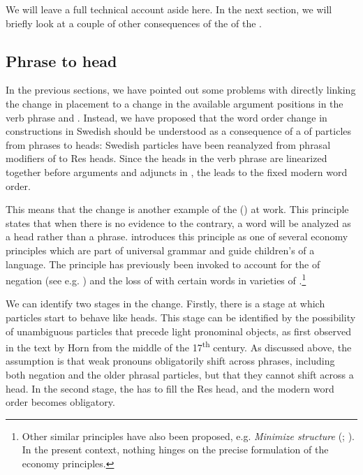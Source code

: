 \documentclass[output=paper]{langscibook}
\begin{document}
We will leave a full technical account aside here. In the next section, we will briefly look at a couple of other consequences of the  of the . 


\subsection{Phrase to head}\label{sec:lalu:6.3}

In the previous sections, we have pointed out some problems with directly linking the change in  placement to a change in the available argument positions in the verb phrase and . Instead, we have proposed that the word order change in  constructions in Swedish should be understood as a consequence of a  of particles from phrases to heads: Swedish particles have been reanalyzed from phrasal modifiers of  to Res heads. Since the heads in the verb phrase are linearized together before arguments and adjuncts in , the  leads to the fixed modern word order. 



This means that the change is another example of the  (\citealt{van_Gelderen2004}) at work. This principle states that when there is no evidence to the contrary, a word will be analyzed as a head rather than a phrase. \citet{van_Gelderen2004} introduces this principle as one of several economy principles which are part of universal grammar and guide children’s  of a language. The principle has previously been invoked to account for the  of negation (see e.g. \citealt{Van_gelderen2008}) and the loss of  with certain  words in varieties of  \citep{WestergaardEtAl2017}.\footnote{Other similar principles have also been proposed, e.g. \textit{Minimize structure} (\citealt{CardinalettiStarke1999}; \citealt{BreitbarthEtAl2020}). In the present context, nothing hinges on the precise formulation of the economy principles.}  



We can identify two stages in the change. Firstly, there is a stage at which particles start to behave like heads. This stage can be identified by the possibility of unambiguous particles that precede light pronominal objects, as first observed in the text by Horn from the middle of the 17\textsuperscript{th} century. As discussed above, the assumption is that weak pronouns obligatorily shift across  phrases, including both negation and the older phrasal particles, but that they cannot shift across a head. In the second stage, the  has to fill the Res head, and the modern word order becomes obligatory. 
\end{document}
